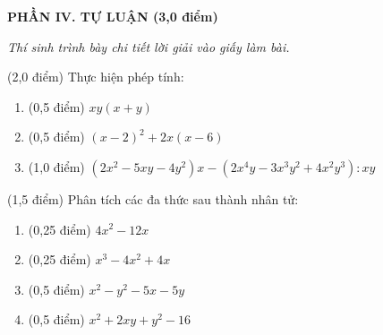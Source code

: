 \documentclass[12pt,a4paper]{article}
\begin{document}
\setcounter{ex}{0}
\noindent\textbf{\large PHẦN IV. TỰ LUẬN (3,0 điểm)}

\textit{Thí sinh trình bày chi tiết lời giải vào giấy làm bài.}

\vspace{1mm}
\begin{ex} (2,0 điểm)
Thực hiện phép tính:
\begin{enumerate}[label=\textbf{\alph*)}, leftmargin=0.8cm, itemsep=2pt]
\item (0,5 điểm) $xy(x + y)$
\item (0,5 điểm) $(x - 2)^2 + 2x(x - 6)$
\item (1,0 điểm) $(2x^2 - 5xy - 4y^2)x - (2x^4y - 3x^3y^2 + 4x^2y^3) : xy$
\end{enumerate}
\end{ex}
\vspace{0.5mm}

\begin{ex} (1,5 điểm)
Phân tích các đa thức sau thành nhân tử:
\begin{enumerate}[label=\textbf{\alph*)}, leftmargin=0.8cm, itemsep=2pt]
\item (0,25 điểm) $4x^2 - 12x$
\item (0,25 điểm) $x^3 - 4x^2 + 4x$
\item (0,5 điểm) $x^2 - y^2 - 5x - 5y$
\item (0,5 điểm) $x^2 + 2xy + y^2 - 16$
\end{enumerate}
\end{ex}
\vspace{0.5mm}
\end{document}
